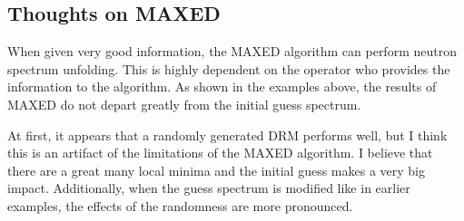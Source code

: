 \subsection*{Thoughts on MAXED}
When given very good information, the MAXED algorithm can perform neutron spectrum unfolding. This is highly dependent on the operator who provides the information to the algorithm. As shown in the examples above, the results of MAXED do not depart greatly from the initial guess spectrum. 

At first, it appears that a randomly generated DRM performs well, but I think this is an artifact of the limitations of the MAXED algorithm. I believe that there are a great many local minima and the initial guess makes a very big impact. Additionally, when the guess spectrum is modified like in earlier examples, the effects of the randomness are more pronounced.